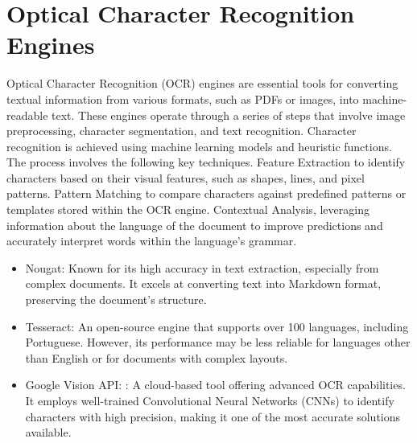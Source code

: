 \section{Optical Character Recognition Engines}
\label{sec:ocr}
Optical Character Recognition (OCR) engines are essential tools for converting textual information from various formats, such as PDFs or images, into machine-readable text. These engines operate through a series of steps that involve image preprocessing, character segmentation, and text recognition. 
Character recognition is achieved using machine learning models and heuristic functions. The process involves the following key techniques. Feature Extraction to identify characters based on their visual features, such as shapes, lines, and pixel patterns. Pattern Matching to compare characters against predefined patterns or templates stored within the \ac{OCR} engine. Contextual Analysis, leveraging information about the language of the document to improve predictions and accurately interpret words within the language's grammar.
\begin{itemize}
    \item Nougat\cite{blecher2023nougatneuralopticalunderstanding}: Known for its high accuracy in text extraction, especially from complex documents. It excels at converting text into Markdown format, preserving the document's structure.
    \item Tesseract: An open-source engine that supports over 100 languages, including Portuguese. However, its performance may be less reliable for languages other than English or for documents with complex layouts.
    \item Google Vision API: : A cloud-based tool offering advanced OCR capabilities. It employs well-trained Convolutional Neural Networks (CNNs) to identify characters with high precision, making it one of the most accurate solutions available.
\end{itemize}

